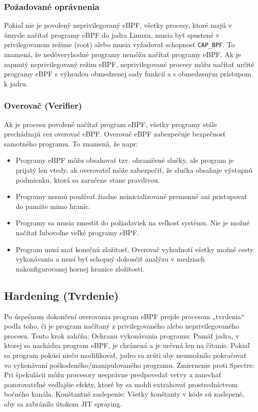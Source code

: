 \subsubsection*{Požadované oprávnenia}
Pokiaľ nie je povolený neprivilegovaný eBPF, všetky procesy, ktoré majú v úmysle načítať programy eBPF do jadra Linuxu, musia byť spustené v privilegovanom režime (root) alebo musia vyžadovať schopnosť \texttt{CAP\_BPF}. To znamená, že nedôveryhodné programy nemôžu načítať programy eBPF.
Ak je zapnutý neprivilegovaný režim eBPF, neprivilegované procesy môžu načítať určité programy eBPF s výhradou obmedzenej sady funkcií a s obmedzeným prístupom k jadru.

\subsubsection*{Overovač (Verifier)}
Ak je procesu povolené načítať program eBPF, všetky programy stále prechádzajú cez overovač eBPF. Overovač eBPF zabezpečuje bezpečnosť samotného programu. To znamená, že napr:
\begin{itemize}
\item Programy eBPF môžu obsahovať tzv. ohraničené slučky, ale program je prijatý len vtedy, ak overovateľ môže zabezpečiť, že slučka obsahuje výstupnú podmienku, ktorá sa zaručene stane pravdivou.
\item Programy nesmú používať žiadne neinicializované premenné ani pristupovať do pamäte mimo hraníc.
\item Programy sa musia zmestiť do požiadaviek na veľkosť systému. Nie je možné načítať ľubovoľne veľké programy eBPF.
\item Program musí mať konečnú zložitosť. Overovač vyhodnotí všetky možné cesty vykonávania a musí byť schopný dokončiť analýzu v medziach nakonfigurovanej hornej hranice zložitosti.
\end{itemize}

\subsection*{Hardening (Tvrdenie)}
Po úspešnom dokončení overovania program eBPF prejde procesom „tvrdenia“ podľa toho, či je program načítaný z privilegovaného alebo neprivilegovaného procesu. Tento krok zahŕňa:
Ochranu vykonávania programu: 
Pamäť jadra, v ktorej sa nachádza program eBPF, je chránená a je určená len na čítanie. Pokiaľ sa program pokúsi niečo modifikovať, jadro sa zrúti aby neumožnilo pokračovať vo vykonávaní poškodeného/manipulovaného programu.
Zmiernenie proti Spectre: 
Pri špekulácii môžu procesory nesprávne predpovedať vetvy a zanechať pozorovateľné vedľajšie efekty, ktoré by sa mohli extrahovať prostredníctvom bočného kanála.
Konštantné zaslepenie: 
Všetky konštanty v kóde sú zaslepené, aby sa zabránilo útokom JIT spraying.

